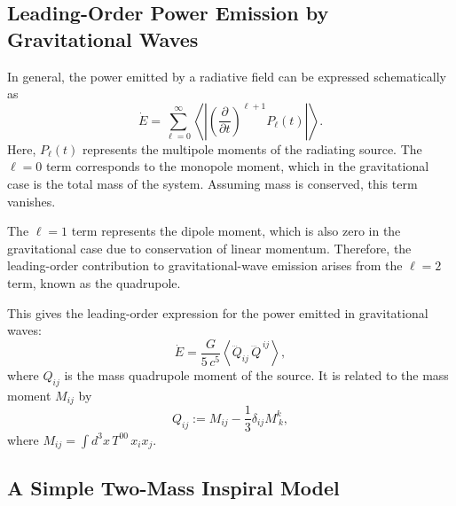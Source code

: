 \documentclass{article}
\begin{document}

\subsection*{Leading-Order Power Emission by Gravitational Waves}
\label{subsec:GW_power}

In general, the power emitted by a radiative field can be expressed schematically as
\begin{equation}
    \dot{E} = \sum_{\ell = 0}^{\infty} \left\langle \left| \left( \frac{\partial}{\partial t} \right)^{\ell+1} P_\ell(t) \right| \right\rangle.
\end{equation}
Here, \(P_{\ell}(t)\) represents the multipole moments of the radiating source. The \(\ell = 0\) term corresponds to the monopole moment, which in the gravitational case is the total mass of the system. Assuming mass is conserved, this term vanishes.

\noindent
The \(\ell = 1\) term represents the dipole moment, which is also zero in the gravitational case due to conservation of linear momentum. Therefore, the leading-order contribution to gravitational-wave emission arises from the \(\ell = 2\) term, known as the quadrupole.

\noindent
This gives the leading-order expression for the power emitted in gravitational waves:
\begin{equation}
\dot{E} = \frac{G}{5\,c^5}
\left\langle \dddot{Q}_{ij}\,\dddot{Q}^{\,ij} \right\rangle,
\end{equation}
where \(Q_{ij}\) is the mass quadrupole moment of the source. It is related to the mass moment \(M_{ij}\) by
\begin{equation}
Q_{ij} := M_{ij} - \frac{1}{3} \delta_{ij} M^k_{\ k},
\end{equation}
where \(M_{ij} = \int d^3x\, T^{00}\, x_i x_j\).



\subsection*{A Simple Two-Mass Inspiral Model}
\label{subsec:two_mass_example}
\end{document}
